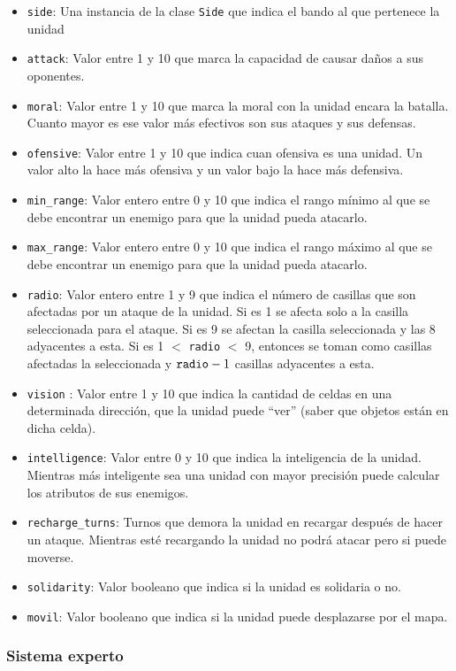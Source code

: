 \begin{itemize}
	\item \verb|side|: Una instancia de la clase \verb|Side| que indica el bando al que pertenece la unidad
	\item \verb|attack|: Valor entre 1 y 10 que marca la capacidad de causar daños a sus oponentes.
	\item \verb|moral|: Valor entre 1 y 10 que marca la moral con la unidad encara la batalla. Cuanto mayor es ese valor más efectivos son sus ataques y sus defensas.
	\item \verb|ofensive|: Valor entre 1 y 10 que indica cuan ofensiva es una unidad. Un valor alto la hace más ofensiva y un valor bajo la hace más defensiva.
	\item \verb|min_range|: Valor entero entre 0 y 10 que indica el rango mínimo al que se debe encontrar un enemigo para que la unidad pueda atacarlo.
	\item \verb|max_range|: Valor entero entre 0 y 10 que indica el rango máximo al que se debe encontrar un enemigo para que la unidad pueda atacarlo.
	\item \verb|radio|: Valor entero entre 1 y 9 que indica el número de casillas que son afectadas por un ataque de la unidad. Si es 1 se afecta solo a la casilla seleccionada para el ataque. Si es 9 se afectan la casilla seleccionada y las 8 adyacentes a esta. Si es 1 $<$ \verb|radio| $<$ 9, entonces se toman como casillas afectadas la seleccionada y $\verb|radio|-1$ casillas adyacentes a esta.
	\item \verb|vision| : Valor entre 1 y 10 que indica la cantidad de celdas en una determinada dirección, que la unidad puede ``ver'' (saber que objetos están en dicha celda).   
	\item \verb|intelligence|: Valor entre 0 y 10 que indica la inteligencia de la unidad. Mientras más inteligente sea una unidad con mayor precisión puede calcular los atributos de sus enemigos.
	\item \verb|recharge_turns|: Turnos que demora la unidad en recargar después de hacer un ataque. Mientras esté recargando la unidad no podrá atacar pero si puede moverse.
	\item \verb|solidarity|: Valor booleano que indica si la unidad es solidaria o no.
	\item \verb|movil|: Valor booleano que indica si la unidad puede desplazarse por el mapa.  
\end{itemize}

\subsubsection{Sistema experto}

